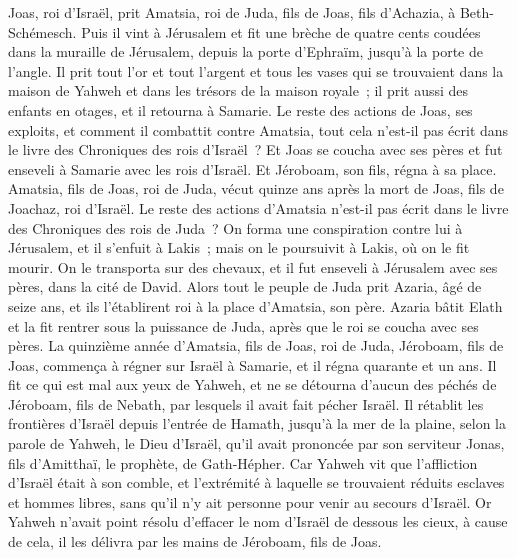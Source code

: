 \begin{multicols}{2}
Joas, roi d'Israël, prit Amatsia, roi de Juda, fils de Joas, fils d'Achazia, à Beth-Schémesch. Puis il vint à Jérusalem et fit une brèche de quatre cents coudées dans la muraille de Jérusalem, depuis la porte d'Ephraïm, jusqu'à la porte de l'angle.
Il prit tout l'or et tout l'argent et tous les vases qui se trouvaient dans la maison de Yahweh et dans les trésors de la maison royale~; il prit aussi des enfants en otages, et il retourna à Samarie.
Le reste des actions de Joas, ses exploits, et comment il combattit contre Amatsia, tout cela n'est-il pas écrit dans le livre des Chroniques des rois d'Israël~?
Et Joas se coucha avec ses pères et fut enseveli à Samarie avec les rois d'Israël. Et Jéroboam, son fils, régna à sa place.
Amatsia, fils de Joas, roi de Juda, vécut quinze ans après la mort de Joas, fils de Joachaz, roi d'Israël.
Le reste des actions d'Amatsia n'est-il pas écrit dans le livre des Chroniques des rois de Juda~?
On forma une conspiration contre lui à Jérusalem, et il s'enfuit à Lakis~; mais on le poursuivit à Lakis, où on le fit mourir.
On le transporta sur des chevaux, et il fut enseveli à Jérusalem avec ses pères, dans la cité de David.
Alors tout le peuple de Juda prit Azaria, âgé de seize ans, et ils l'établirent roi à la place d'Amatsia, son père.
Azaria bâtit Elath et la fit rentrer sous la puissance de Juda, après que le roi se coucha avec ses pères.
La quinzième année d'Amatsia, fils de Joas, roi de Juda, Jéroboam, fils de Joas, commença à régner sur Israël à Samarie, et il régna quarante et un ans.
Il fit ce qui est mal aux yeux de Yahweh, et ne se détourna d'aucun des péchés de Jéroboam, fils de Nebath, par lesquels il avait fait pécher Israël.
Il rétablit les frontières d'Israël depuis l'entrée de Hamath, jusqu'à la mer de la plaine, selon la parole de Yahweh, le Dieu d'Israël, qu'il avait prononcée par son serviteur Jonas, fils d'Amitthaï, le prophète, de Gath-Hépher.
Car Yahweh vit que l'affliction d'Israël était à son comble, et l'extrémité à laquelle se trouvaient réduits esclaves et hommes libres, sans qu'il n'y ait personne pour venir au secours d'Israël.
Or Yahweh n'avait point résolu d'effacer le nom d'Israël de dessous les cieux, à cause de cela, il les délivra par les mains de Jéroboam, fils de Joas.

\end{multicols}
